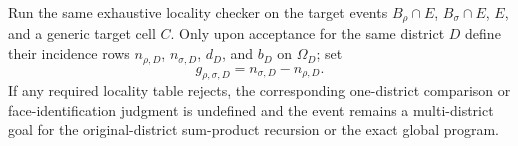 Run the same exhaustive locality checker on the target events \(B_\rho\cap E\), \(B_\sigma\cap E\), \(E\), and a generic target cell \(C\).  Only upon acceptance for the same district \(D\) define their incidence rows \(n_{\rho,D}\), \(n_{\sigma,D}\), \(d_D\), and \(b_D\) on \(\Omega_D\); set
\[
g_{\rho,\sigma,D}=n_{\sigma,D}-n_{\rho,D}.
\]
If any required locality table rejects, the corresponding one-district comparison or face-identification judgment is undefined and the event remains a multi-district goal for the original-district sum-product recursion or the exact global program.